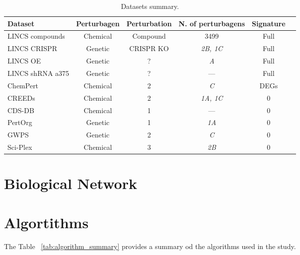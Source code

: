 \bgroup
\begin{xltabular}{\textwidth}{Xccccc}
    \caption{Datasets summary.}
    \label{tab:dataset_summary}\\
    \toprule
    \textbf{Dataset}                & \textbf{Perturbagen}     & \textbf{Perturbation}  & \textbf{N. of perturbagens}    & \textbf{Signature} \\
    \midrule
LINCS compounds            & Chemical        & Compound      & 3499                  & Full      \\
LINCS CRISPR               & Genetic         & CRISPR KO     & \emph{2B, 1C}         & Full      \\
LINCS OE                   & Genetic         & ?             & \emph{A}              & Full      \\
LINCS shRNA a375           & Genetic         & ?             & ---                   & Full      \\
ChemPert                   & Chemical        & 2             & \emph{C}              & DEGs      \\
CREEDs                     & Chemical        & 2             & \emph{1A, 1C}         & 0 \\
CDS-DB                     & Chemical        & 1             & ---                   & 0 \\
PertOrg                    & Genetic         & 1             & \emph{1A}             & 0 \\
GWPS                       & Genetic         & 2             & \emph{C}              & 0 \\
Sci-Plex                   & Chemical        & 3             & \emph{2B}             & 0 \\
    \bottomrule
    \end{xltabular}
\egroup


\section{Biological Network} %
\label{sec:biological_network}



\section{Algortithms} %
\label{sec:algorithms}

The Table ~\ref{tab:algorithm_summary} provides a summary od the algorithms used in the study.

